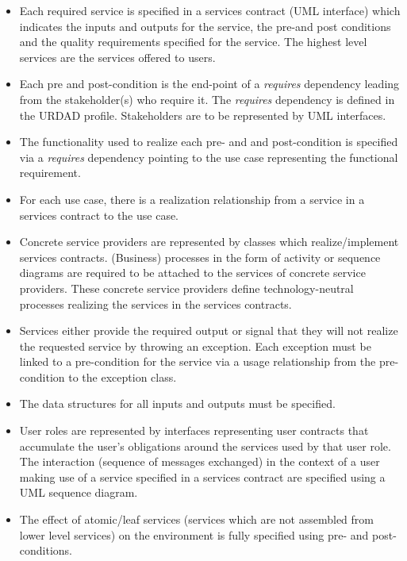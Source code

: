 \begin{itemize}
  \item Each required service is specified in a services contract (UML interface) which indicates the inputs and outputs for the service, the pre-and post conditions and the quality requirements specified for the service. The highest level services are the services offered to users.
  \item Each pre and post-condition is the end-point of a {\em requires} dependency leading from the stakeholder(s) who require it. The {\em requires} dependency is defined in the URDAD profile. Stakeholders are to be represented by UML interfaces.
  \item The functionality used to realize each pre- and and post-condition is specified via a {\em requires} dependency pointing to the use case representing the functional requirement.
  \item For each use case, there is a realization relationship from a service in a services contract to the use case.
  \item Concrete service providers are represented by classes which realize/implement services contracts. (Business) processes in the form of activity or sequence diagrams are required to be attached to the services of concrete service providers. These concrete service providers define technology-neutral processes realizing the services in the services contracts.
  \item Services either provide the required output or signal that they will not realize the requested service by throwing an exception. Each exception must be linked to a pre-condition for the service via a usage relationship from the pre-condition to the exception class.
  \item The data structures for all inputs and outputs must be specified.
  \item User roles are represented by interfaces representing user contracts that accumulate the user's obligations around the services used by that user role. The interaction (sequence of messages exchanged) in the context of a user making use of a service specified in a services  contract are specified using a UML sequence diagram.
  \item The effect of atomic/leaf services (services which are not assembled from lower level services) on the environment is fully specified using pre- and post-conditions.
\end{itemize}

